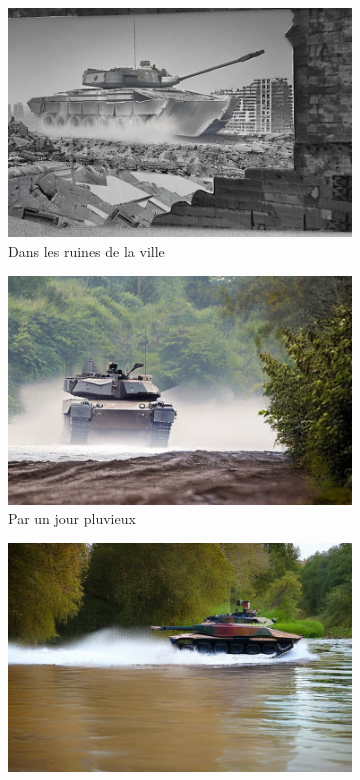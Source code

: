 \begin{figure}[H]
    \centering
    \begin{subfigure}[b]{0.49\textwidth}
        \centering
        \includegraphics[width=\textwidth]{./images/v2_tank-city_ruins-1.png}
        \caption{Dans les ruines de la ville}
    \end{subfigure}
    \begin{subfigure}[b]{0.49\textwidth}
        \centering
        \includegraphics[width=\textwidth]{./images/v2_tank-rainy_day-3.png}
        \caption{Par un jour pluvieux}
    \end{subfigure}
    \hfill
    \begin{subfigure}[b]{0.49\textwidth}
        \centering
        \includegraphics[width=\textwidth]{./images/v2_tank-river_crossing-0.png}

\end{subfigure}
\end{figure}
